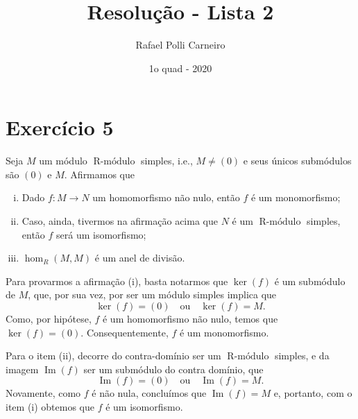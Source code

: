 \documentclass[11pt,twoside,a4paper]{article}
\title{Resolução - Lista 2}
\author{Rafael Polli Carneiro}
\date{1o quad - 2020}
\DeclareMathOperator{\RMod}{ R-\text{módulo}}
\DeclareMathOperator {\Imagem}{ Im }
\theoremstyle{remark}
\theoremstyle{definition}
\theoremstyle{plain}
\begin{document}
\maketitle
\tableofcontents

\section{Exercício 5}
Seja $M$ um módulo $\RMod$ simples, i.e., $M \neq (0)$ e seus únicos submódulos são $(0)$ e $M$.
Afirmamos que
\begin{enumerate}[(i)]
    \item Dado $f: M \to N$ um homomorfismo não nulo, então $f$ é um monomorfismo;
    \item Caso, ainda, tivermos na afirmação acima que $N$ é um $\RMod$ simples, então
          $f$ será um isomorfismo;
    \item $\hom_R(M,M)$ é um anel de divisão.
\end{enumerate}

Para provarmos a afirmação (i), basta notarmos que $\ker(f)$ é um submódulo de $M$, que, por sua vez,
por ser um módulo simples implica que
    \[ \ker(f) = (0) \quad \text{ou} \quad \ker(f) = M.\]
Como, por hipótese, $f$ é um homomorfismo não nulo, temos que $\ker(f) = (0)$. Consequentemente,
$f$ é um monomorfismo.

Para  o item (ii), decorre do contra-domínio ser um $\RMod$ simples, e da imagem $\Imagem(f)$ ser um submódulo
do contra domínio, que
    \[ \Imagem(f) = (0) \quad \text{ou} \quad \Imagem(f) = M.\]
Novamente, como $f$ é não  nula, concluímos que $\Imagem(f) = M$ e, portanto, com o item (i) obtemos que
$f$ é um isomorfismo.
\end{document}
